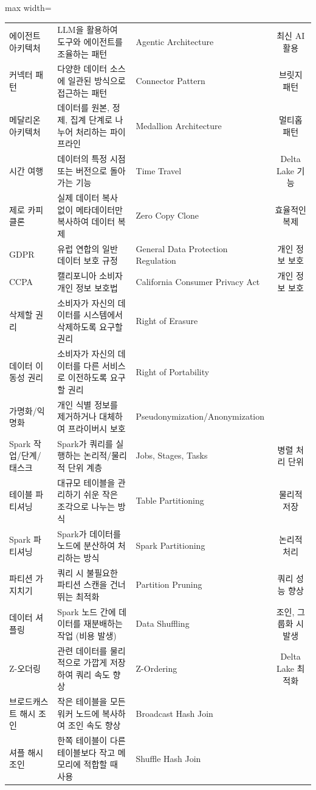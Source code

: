 \documentclass[11pt,a4paper]{article}
\begin{document}
\begin{adjustbox}{max width=\textwidth}
\begin{tabular}{lllc}
에이전트 아키텍처 & LLM을 활용하여 도구와 에이전트를 조율하는 패턴 & Agentic Architecture & 최신 AI 활용 \\
커넥터 패턴 & 다양한 데이터 소스에 일관된 방식으로 접근하는 패턴 & Connector Pattern & 브릿지 패턴 \\
메달리온 아키텍처 & 데이터를 원본, 정제, 집계 단계로 나누어 처리하는 파이프라인 & Medallion Architecture & 멀티홉 패턴 \\
시간 여행 & 데이터의 특정 시점 또는 버전으로 돌아가는 기능 & Time Travel & Delta Lake 기능 \\
제로 카피 클론 & 실제 데이터 복사 없이 메타데이터만 복사하여 데이터 복제 & Zero Copy Clone & 효율적인 복제 \\
GDPR & 유럽 연합의 일반 데이터 보호 규정 & General Data Protection Regulation & 개인 정보 보호 \\
CCPA & 캘리포니아 소비자 개인 정보 보호법 & California Consumer Privacy Act & 개인 정보 보호 \\
삭제할 권리 & 소비자가 자신의 데이터를 시스템에서 삭제하도록 요구할 권리 & Right of Erasure & \\
데이터 이동성 권리 & 소비자가 자신의 데이터를 다른 서비스로 이전하도록 요구할 권리 & Right of Portability & \\
가명화/익명화 & 개인 식별 정보를 제거하거나 대체하여 프라이버시 보호 & Pseudonymization/Anonymization & \\
Spark 작업/단계/태스크 & Spark가 쿼리를 실행하는 논리적/물리적 단위 계층 & Jobs, Stages, Tasks & 병렬 처리 단위 \\
테이블 파티셔닝 & 대규모 테이블을 관리하기 쉬운 작은 조각으로 나누는 방식 & Table Partitioning & 물리적 저장 \\
Spark 파티셔닝 & Spark가 데이터를 노드에 분산하여 처리하는 방식 & Spark Partitioning & 논리적 처리 \\
파티션 가지치기 & 쿼리 시 불필요한 파티션 스캔을 건너뛰는 최적화 & Partition Pruning & 쿼리 성능 향상 \\
데이터 셔플링 & Spark 노드 간에 데이터를 재분배하는 작업 (비용 발생) & Data Shuffling & 조인, 그룹화 시 발생 \\
Z-오더링 & 관련 데이터를 물리적으로 가깝게 저장하여 쿼리 속도 향상 & Z-Ordering & Delta Lake 최적화 \\
브로드캐스트 해시 조인 & 작은 테이블을 모든 워커 노드에 복사하여 조인 속도 향상 & Broadcast Hash Join & \\
셔플 해시 조인 & 한쪽 테이블이 다른 테이블보다 작고 메모리에 적합할 때 사용 & Shuffle Hash Join & \\

\end{tabular}
\end{adjustbox}
\end{document}
